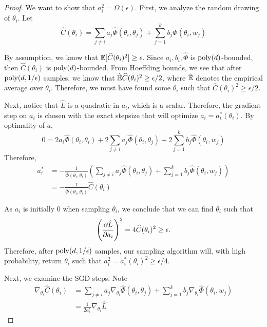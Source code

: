 \begin{proof}
We want to show that $a_i^2 = \Omega(\epsilon)$. First, we analyze the random drawing of $\theta_i$.  Let 
%
\[  \widehat{C}(\theta_i) = \sum_{j\neq i} a_j \widehat{\Phi}(\theta_i,\theta_j) + \sum_{j=1}^k b_j \widehat{\Phi}(\theta_i,w_j)\]
%

By assumption, we know that $\operatorname*{\mathbb{E}}[\widehat{C}(\theta_i)^2] \geq
\epsilon$. Since $a_i,b_i, \widehat{\Phi}$ is $\mathrm{poly}(d)$-bounded, then $\widehat{C}(\theta_i)$ is $\mathrm{poly}(d)$-bounded. From Hoeffding bounds, we see that after $\mathrm{poly}(d,1/\epsilon)$ samples, we know that $\hat{\operatorname*{\mathbb{E}}}\widehat{C}(\theta_i)^2 \geq \epsilon/2$, where $\hat{\operatorname*{\mathbb{E}}}$ denotes the empirical average over $\theta_i$. Therefore, we must have found some $\theta_i$ such that $\widehat{C}(\theta_i)^2 \geq \epsilon/2$.

Next, notice that $\hat{L}$ is a quadratic in $a_i$, which is a
scalar. Therefore, the gradient step on $a_i$ is chosen with the exact
stepsize that will optimize $a_i = a_i^*(\theta_i)$.  By optimality of
$a$,
%
\begin{equation}
0 = 2a_i \widehat{\Phi}(\theta_i,\theta_i) + 2\sum_{j\neq i} a_j \widehat{\Phi}(\theta_i,\theta_j) + 2\sum_{j=1}^k b_j \widehat{\Phi}(\theta_i,w_j)
\end{equation} 
%
Therefore, 
%
\begin{align*}
 a_i^* & = - \frac{1}{\widehat{\Phi}(\theta_i,\theta_i)} (\sum_{j\neq i} a_j \widehat{\Phi}(\theta_i,\theta_j) + \sum_{j=1}^k b_j \widehat{\Phi}(\theta_i,w_j)) \\
& = -\frac{1}{\widehat{\Phi}(\theta_i,\theta_i)}\widehat{C}(\theta_i) 
\end{align*}


As $a_i$ is initially $0$ when sampling $\theta_i$, we conclude that we can find $\theta_i$ such that
%
\[ \left( \frac{\partial\hat{L}}{\partial a_i} \right)^2 = 4 \widehat{C}(\theta_i)^2 \geq \epsilon.\]
Therefore, after $\mathrm{poly}(d,1/\epsilon)$ samples, our sampling algorithm will, with high probability, return $\theta_i$  such that $a_i^2 = a_i^*(\theta_i)^2 \geq \epsilon /4$. 

Next, we examine the SGD steps. Note
%
\begin{align*}
\nabla_{\theta_i} \widehat{C}(\theta_i) & =  \sum_{j\neq i} a_j \nabla_{\theta_i}\widehat{\Phi}(\theta_i,\theta_j) + \sum_{j=1}^k b_j \nabla_{\theta_i}\widehat{\Phi}(\theta_i,w_j) \\
& = \frac{1}{2a_i^*} \nabla_{\theta_i}\widehat{L}
\end{align*}


\end{proof}
